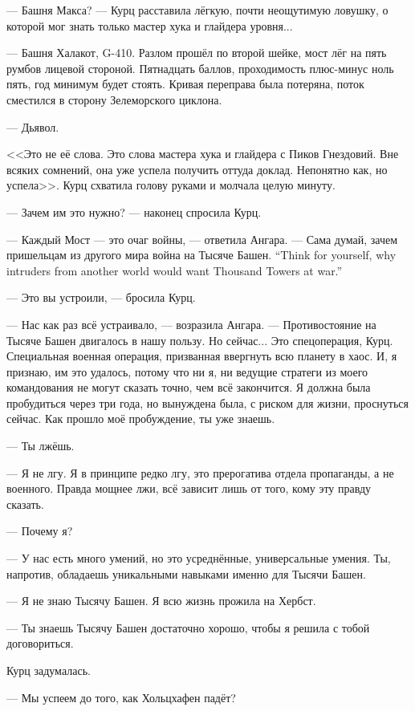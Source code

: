 --- Башня Макса? --- Курц расставила лёгкую, почти неощутимую ловушку, о которой мог знать только мастер хука и глайдера уровня...

--- Башня Халакот, G-410.
Разлом прошёл по второй шейке, мост лёг на пять румбов лицевой стороной.
Пятнадцать баллов, проходимость плюс-минус ноль пять, год минимум будет стоять.
Кривая переправа была потеряна, поток сместился в сторону Зелеморского циклона.

--- Дьявол.

<<Это не её слова.
Это слова мастера хука и глайдера с Пиков Гнездовий.
Вне всяких сомнений, она уже успела получить оттуда доклад.
Непонятно как, но успела>>.
Курц схватила голову руками и молчала целую минуту.

--- Зачем им это нужно? --- наконец спросила Курц.

--- Каждый Мост --- это очаг войны, --- ответила Ангара.
{--- Сама думай, зачем пришельцам из другого мира война на Тысяче Башен.}
{``Think for yourself, why intruders from another world would want Thousand Towers at war.''}

--- Это вы устроили, --- бросила Курц.

--- Нас как раз всё устраивало, --- возразила Ангара.
--- Противостояние на Тысяче Башен двигалось в нашу пользу.
Но сейчас...
Это спецоперация, Курц.
Специальная военная операция, призванная ввергнуть всю планету в хаос.
И, я признаю, им это удалось, потому что ни я, ни ведущие стратеги из моего командования не могут сказать точно, чем всё закончится.
Я должна была пробудиться через три года, но вынуждена была, с риском для жизни, проснуться сейчас.
Как прошло моё пробуждение, ты уже знаешь.

--- Ты лжёшь.

--- Я не лгу.
Я в принципе редко лгу, это прерогатива отдела пропаганды, а не военного.
Правда мощнее лжи, всё зависит лишь от того, кому эту правду сказать.

--- Почему я?

--- У нас есть много умений, но это усреднённые, универсальные умения.
Ты, напротив, обладаешь уникальными навыками именно для Тысячи Башен.

--- Я не знаю Тысячу Башен.
Я всю жизнь прожила на Хербст.

--- Ты знаешь Тысячу Башен достаточно хорошо, чтобы я решила с тобой договориться.

Курц задумалась.

--- Мы успеем до того, как Хольцхафен падёт?

